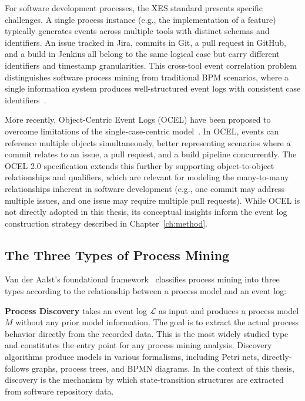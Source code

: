 For software development processes, the XES standard presents specific
challenges. A single process instance (e.g., the implementation of a
feature) typically generates events across multiple tools with distinct
schemas and identifiers. An issue tracked in Jira, commits in Git, a pull
request in GitHub, and a build in Jenkins all belong to the same logical
case but carry different identifiers and timestamp granularities. This
cross-tool event correlation problem distinguishes software process mining
from traditional BPM scenarios, where a single information system produces
well-structured event logs with consistent case
identifiers~\cite{poncin2011process}.

More recently, Object-Centric Event Logs (OCEL) have been proposed to
overcome limitations of the single-case-centric model~\cite{vanderAalst2019ObjectCentric}.
In OCEL, events can reference multiple objects simultaneously, better
representing scenarios where a commit relates to an issue, a pull request,
and a build pipeline concurrently. The OCEL 2.0 specification extends this
further by supporting object-to-object relationships and qualifiers, which
are relevant for modeling the many-to-many relationships inherent in
software development (e.g., one commit may address multiple issues, and one
issue may require multiple pull requests). While OCEL is not directly
adopted in this thesis, its conceptual insights inform the event log
construction strategy described in Chapter~\ref{ch:method}.


\subsection{The Three Types of Process Mining}
\label{sec:pm-types}

Van der Aalst's foundational
framework~\cite{aalst2016process,aalst2012process} classifies process
mining into three types according to the relationship between a process
model and an event log:

\textbf{Process Discovery} takes an event log $\mathcal{L}$ as input and
produces a process model $M$ without any prior model information. The goal
is to extract the actual process behavior directly from the recorded data.
This is the most widely studied type and constitutes the entry point for any
process mining analysis. Discovery algorithms produce models in various
formalisms, including Petri nets, directly-follows graphs, process trees,
and BPMN diagrams. In the context of this thesis, discovery is the mechanism
by which state-transition structures are extracted from software repository
data.

